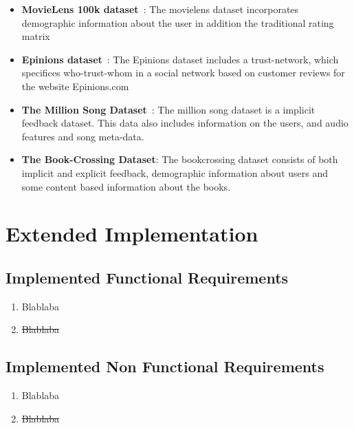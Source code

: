 \begin{itemize}

\item \textbf{MovieLens 100k dataset}~\cite{Movielens}: The movielens dataset
	incorporates demographic information about the user in addition the
	traditional rating matrix

\item \textbf{Epinions dataset}~\cite{Epinions}: The Epinions dataset includes a
	trust-network, which specifices who-trust-whom in a social network based on
	customer reviews for the website Epinions.com

\item \textbf{The Million Song Dataset}~\cite{Bertin-Mahieux2011}: The million song
	dataset is a implicit feedback dataset. This data also includes information on the users,
	and audio features and song meta-data.

\item \textbf{The Book-Crossing Dataset}: The bookcrossing dataset consists of both implicit and explicit feedback,
	demographic information about users and some content based information about the books.
\end{itemize}

\chapter{Extended Implementation}
\label{app:impl}

\section{Implemented Functional Requirements}
\begin{enumerate}[label=\bfseries FR \arabic*:]
  \item {\color{ForestGreen}Blablaba}
  \item {\color{RedOrange}\st{Blablaba}}
\end{enumerate}

\section{Implemented Non Functional Requirements}
\begin{enumerate}[label=\bfseries NFR \arabic*:]
  \item {\color{ForestGreen}Blablaba}
  \item {\color{RedOrange}\st{Blablaba}}
\end{enumerate}

